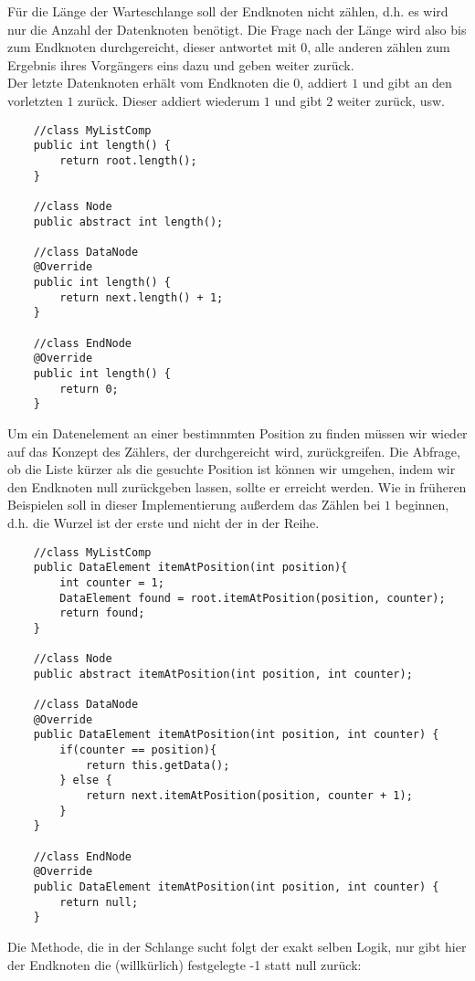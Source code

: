 \documentclass{article}
\begin{document}
Für die Länge der Warteschlange soll der Endknoten nicht zählen, d.h. es wird nur die Anzahl der Datenknoten benötigt. Die Frage nach der Länge wird also bis zum Endknoten durchgereicht, dieser antwortet mit 0, alle anderen zählen zum Ergebnis ihres Vorgängers eins dazu und geben weiter zurück. \\
\bsp Der letzte Datenknoten erhält vom Endknoten die $0$, addiert $1$ und gibt an den vorletzten $1$ zurück. Dieser addiert wiederum $1$ und gibt $2$ weiter zurück, usw.
\begin{verbatim}
    //class MyListComp 
    public int length() {
        return root.length();
    }    

    //class Node 
    public abstract int length();

    //class DataNode 
    @Override
    public int length() {
        return next.length() + 1;
    }

    //class EndNode 
    @Override
    public int length() {
        return 0;
    }
\end{verbatim}
Um ein Datenelement an einer bestimnmten Position zu finden müssen wir wieder auf das Konzept des Zählers, der durchgereicht wird, zurückgreifen. Die Abfrage, ob die Liste kürzer als die gesuchte Position ist können wir umgehen, indem wir den Endknoten null zurückgeben lassen, sollte er erreicht werden. Wie in früheren Beispielen soll in dieser Implementierung außerdem das Zählen bei $1$ beginnen, d.h. die Wurzel ist der erste und nicht der  in der Reihe.
\begin{verbatim}
    //class MyListComp
    public DataElement itemAtPosition(int position){
        int counter = 1;
        DataElement found = root.itemAtPosition(position, counter);
        return found;
    }

    //class Node 
    public abstract itemAtPosition(int position, int counter);

    //class DataNode 
    @Override
    public DataElement itemAtPosition(int position, int counter) {
        if(counter == position){
            return this.getData();
        } else {
            return next.itemAtPosition(position, counter + 1);
        }
    }

    //class EndNode 
    @Override
    public DataElement itemAtPosition(int position, int counter) {
        return null;
    }
\end{verbatim}
Die Methode, die in der Schlange sucht folgt der exakt selben Logik, nur gibt hier der Endknoten die (willkürlich) festgelegte -1 statt null zurück:
\end{document}
